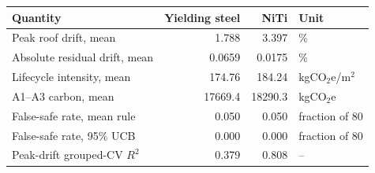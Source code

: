 \begin{tabular}{lrrl}
\toprule
Quantity & Yielding steel & NiTi & Unit \\
\midrule
Peak roof drift, mean & 1.788 & 3.397 & \% \\
Absolute residual drift, mean & 0.0659 & 0.0175 & \% \\
Lifecycle intensity, mean & 174.76 & 184.24 & kgCO$_2$e/m$^2$ \\
A1--A3 carbon, mean & 17669.4 & 18290.3 & kgCO$_2$e \\
False-safe rate, mean rule & 0.050 & 0.050 & fraction of 80 \\
False-safe rate, 95\% UCB & 0.000 & 0.000 & fraction of 80 \\
Peak-drift grouped-CV $R^2$ & 0.379 & 0.808 & -- \\
\bottomrule
\end{tabular}
